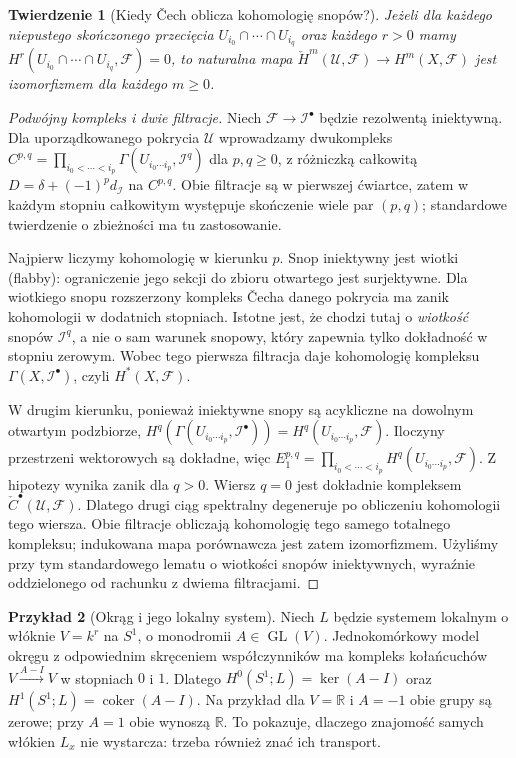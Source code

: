 \documentclass[11pt,a4paper,oneside]{report}
\newcommand{\R}{\mathbb{R}}
\theoremstyle{plain}
\newtheorem{twierdzenie}{Twierdzenie}[section]
\theoremstyle{definition}
\newtheorem{przyklad}[twierdzenie]{Przykład}
\theoremstyle{remark}
\begin{document}
\begin{twierdzenie}[Kiedy \v{C}ech oblicza kohomologię snopów?]
\label{thm:leray-sheaf-v12}
Jeżeli dla każdego niepustego skończonego przecięcia
$U_{i_0}\cap\cdots\cap U_{i_q}$ oraz każdego $r>0$ mamy
$H^r(U_{i_0}\cap\cdots\cap U_{i_q},\mathcal F)=0$,
to naturalna mapa
$\check H^m(\mathcal U,\mathcal F)\to H^m(X,\mathcal F)$
jest izomorfizmem dla każdego $m\ge0$.
\end{twierdzenie}
\begin{proof}[Podwójny kompleks i dwie filtracje]
Niech $\mathcal F\to\mathcal I^\bullet$ będzie rezolwentą
iniektywną. Dla uporządkowanego pokrycia $\mathcal U$
wprowadzamy dwukompleks
$C^{p,q}=\prod_{i_0<\cdots<i_p}
\Gamma(U_{i_0\cdots i_p},\mathcal I^q)$ dla $p,q\ge0$,
z różniczką całkowitą
$D=\delta+(-1)^p d_{\mathcal I}$ na $C^{p,q}$.
Obie filtracje są w pierwszej ćwiartce, zatem w każdym
stopniu całkowitym występuje skończenie wiele par $(p,q)$;
standardowe twierdzenie o zbieżności ma tu zastosowanie.

Najpierw liczymy kohomologię w kierunku $p$. Snop
iniektywny jest wiotki (flabby): ograniczenie jego sekcji
do zbioru otwartego jest surjektywne. Dla wiotkiego snopu
rozszerzony kompleks \v{C}echa danego pokrycia ma
zanik kohomologii w dodatnich stopniach. Istotne jest,
że chodzi tutaj o \emph{wiotkość} snopów $\mathcal I^q$,
a nie o sam warunek snopowy, który zapewnia tylko
dokładność w stopniu zerowym. Wobec tego pierwsza
filtracja daje kohomologię kompleksu
$\Gamma(X,\mathcal I^\bullet)$, czyli $H^*(X,\mathcal F)$.

W drugim kierunku, ponieważ iniektywne snopy są
acykliczne na dowolnym otwartym podzbiorze,
$H^q(\Gamma(U_{i_0\cdots i_p},\mathcal I^\bullet))
=H^q(U_{i_0\cdots i_p},\mathcal F)$.
Iloczyny przestrzeni wektorowych są dokładne,
więc $E_1^{p,q}=\prod_{i_0<\cdots<i_p}
H^q(U_{i_0\cdots i_p},\mathcal F)$.
Z hipotezy wynika zanik dla $q>0$.
Wiersz $q=0$ jest dokładnie kompleksem
$\check C^\bullet(\mathcal U,\mathcal F)$.
Dlatego drugi ciąg spektralny degeneruje po obliczeniu
kohomologii tego wiersza. Obie filtracje obliczają
kohomologię tego samego totalnego kompleksu;
indukowana mapa porównawcza jest zatem izomorfizmem.
Użyliśmy przy tym standardowego lematu o wiotkości
snopów iniektywnych, wyraźnie oddzielonego od rachunku
z dwiema filtracjami.
\end{proof}

\begin{przyklad}[Okrąg i jego lokalny system]
Niech $L$ będzie systemem lokalnym o włóknie $V=k^r$
na $S^1$, o monodromii $A\in\operatorname{GL}(V)$.
Jednokomórkowy model okręgu z odpowiednim skręceniem
współczynników ma kompleks kołańcuchów
$V\xrightarrow{A-I}V$ w stopniach $0$ i $1$.
Dlatego
$H^0(S^1;L)=\ker(A-I)$ oraz
$H^1(S^1;L)=\operatorname{coker}(A-I)$.
Na przykład dla $V=\R$ i $A=-1$ obie grupy są zerowe;
przy $A=1$ obie wynoszą $\R$.
To pokazuje, dlaczego znajomość samych włókien $L_x$
nie wystarcza: trzeba również znać ich transport.
\end{przyklad}
\end{document}

